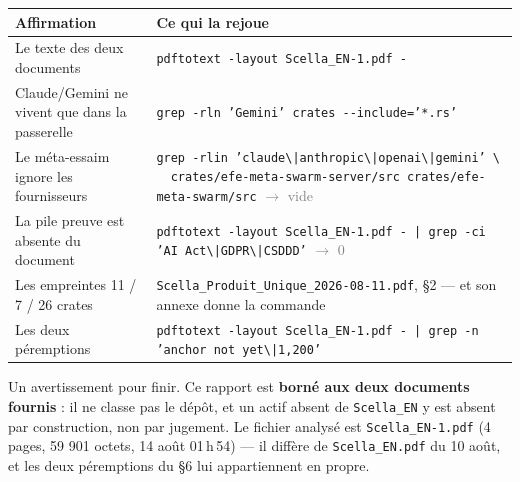 \documentclass[10pt]{article}
\newcommand{\sz}[1]{\textcolor{grey}{\small\textsf{#1}}}
\newcommand{\code}[1]{\texttt{\small #1}}
\begin{document}
\renewcommand{\arraystretch}{1.22}
\begin{center}\small
\begin{tabular}{@{}>{\raggedright\arraybackslash}p{5.5cm} >{\raggedright\arraybackslash}p{10.6cm}@{}}
\toprule
\textbf{Affirmation} & \textbf{Ce qui la rejoue} \\
\midrule
Le texte des deux documents &
  \code{pdftotext -layout Scella\_EN-1.pdf -} \\
Claude/Gemini ne vivent que dans la passerelle &
  \code{grep -rln 'Gemini' crates -{}-include='*.rs'} \\
Le méta-essaim ignore les fournisseurs &
  \code{grep -rlin 'claude\textbackslash|anthropic\textbackslash|openai\textbackslash|gemini' \textbackslash} \newline
  \code{\ \ crates/efe-meta-swarm-server/src crates/efe-meta-swarm/src} \sz{$\rightarrow$ vide} \\
La pile preuve est absente du document &
  \code{pdftotext -layout Scella\_EN-1.pdf - | grep -ci 'AI Act\textbackslash|GDPR\textbackslash|CSDDD'} \sz{$\rightarrow$ 0} \\
Les empreintes 11 / 7 / 26 crates &
  \code{Scella\_Produit\_Unique\_2026-08-11.pdf}, §2 --- et son annexe donne la commande \\
Les deux péremptions &
  \code{pdftotext -layout Scella\_EN-1.pdf - | grep -n 'anchor not yet\textbackslash|1,200'} \\
\bottomrule
\end{tabular}
\end{center}

Un avertissement pour finir. Ce rapport est \textbf{borné aux deux documents fournis} : il ne classe pas
le dépôt, et un actif absent de \code{Scella\_EN} y est absent par construction, non par jugement. Le
fichier analysé est \code{Scella\_EN-1.pdf} (4 pages, 59 901 octets, 14 août 01\,h\,54) --- il diffère de
\code{Scella\_EN.pdf} du 10 août, et les deux péremptions du §6 lui appartiennent en propre.
\end{document}
